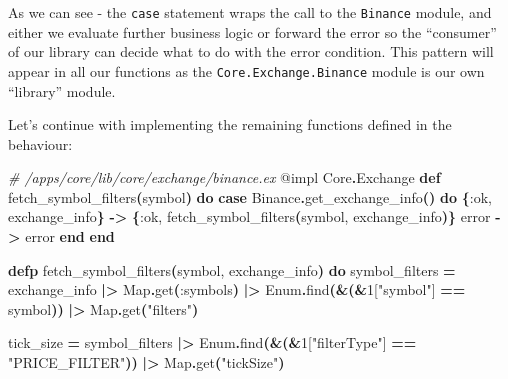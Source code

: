 \documentclass[
  oneside]{book}
\newenvironment{Shaded}{\begin{snugshade}}{\end{snugshade}}
\newcommand{\CommentTok}[1]{\textcolor[rgb]{0.56,0.35,0.01}{\textit{#1}}}
\newcommand{\ConstantTok}[1]{\textcolor[rgb]{0.56,0.35,0.01}{#1}}
\newcommand{\DecValTok}[1]{\textcolor[rgb]{0.00,0.00,0.81}{#1}}
\newcommand{\FunctionTok}[1]{\textcolor[rgb]{0.13,0.29,0.53}{\textbf{#1}}}
\newcommand{\KeywordTok}[1]{\textcolor[rgb]{0.13,0.29,0.53}{\textbf{#1}}}
\newcommand{\NormalTok}[1]{#1}
\newcommand{\OperatorTok}[1]{\textcolor[rgb]{0.81,0.36,0.00}{\textbf{#1}}}
\newcommand{\OtherTok}[1]{\textcolor[rgb]{0.56,0.35,0.01}{#1}}
\newcommand{\StringTok}[1]{\textcolor[rgb]{0.31,0.60,0.02}{#1}}
\newcommand{\VariableTok}[1]{\textcolor[rgb]{0.00,0.00,0.00}{#1}}
\begin{document}
As we can see - the \texttt{case} statement wraps the call to the \texttt{Binance} module, and either we evaluate further business logic or forward the error so the ``consumer'' of our library can decide what to do with the error condition. This pattern will appear in all our functions as the \texttt{Core.Exchange.Binance} module is our own ``library'' module.

Let's continue with implementing the remaining functions defined in the behaviour:

\begin{Shaded}
\begin{Highlighting}[]
  \CommentTok{\# /apps/core/lib/core/exchange/binance.ex}
  \OtherTok{@impl} \ConstantTok{Core}\OperatorTok{.}\ConstantTok{Exchange}
  \KeywordTok{def}\NormalTok{ fetch\_symbol\_filters}\FunctionTok{(}\NormalTok{symbol}\FunctionTok{)} \KeywordTok{do}
    \KeywordTok{case} \ConstantTok{Binance}\OperatorTok{.}\NormalTok{get\_exchange\_info}\FunctionTok{()} \KeywordTok{do}
      \FunctionTok{\{}\VariableTok{:ok}\NormalTok{, exchange\_info}\FunctionTok{\}} \OperatorTok{{-}\textgreater{}} \FunctionTok{\{}\VariableTok{:ok}\NormalTok{, fetch\_symbol\_filters}\FunctionTok{(}\NormalTok{symbol, exchange\_info}\FunctionTok{)\}}
\NormalTok{      error }\OperatorTok{{-}\textgreater{}}\NormalTok{ error}
    \KeywordTok{end}
  \KeywordTok{end}

  \KeywordTok{defp}\NormalTok{ fetch\_symbol\_filters}\FunctionTok{(}\NormalTok{symbol, exchange\_info}\FunctionTok{)} \KeywordTok{do}
\NormalTok{    symbol\_filters }\OperatorTok{=}
\NormalTok{      exchange\_info}
      \OperatorTok{|\textgreater{}} \ConstantTok{Map}\OperatorTok{.}\NormalTok{get}\FunctionTok{(}\VariableTok{:symbols}\FunctionTok{)}
      \OperatorTok{|\textgreater{}} \ConstantTok{Enum}\OperatorTok{.}\NormalTok{find}\FunctionTok{(}\OperatorTok{\&}\FunctionTok{(}\OperatorTok{\&}\DecValTok{1}\OtherTok{[}\StringTok{"symbol"}\OtherTok{]} \OperatorTok{==}\NormalTok{ symbol}\FunctionTok{))}
      \OperatorTok{|\textgreater{}} \ConstantTok{Map}\OperatorTok{.}\NormalTok{get}\FunctionTok{(}\StringTok{"filters"}\FunctionTok{)}

\NormalTok{    tick\_size }\OperatorTok{=}
\NormalTok{      symbol\_filters}
      \OperatorTok{|\textgreater{}} \ConstantTok{Enum}\OperatorTok{.}\NormalTok{find}\FunctionTok{(}\OperatorTok{\&}\FunctionTok{(}\OperatorTok{\&}\DecValTok{1}\OtherTok{[}\StringTok{"filterType"}\OtherTok{]} \OperatorTok{==} \StringTok{"PRICE\_FILTER"}\FunctionTok{))}
      \OperatorTok{|\textgreater{}} \ConstantTok{Map}\OperatorTok{.}\NormalTok{get}\FunctionTok{(}\StringTok{"tickSize"}\FunctionTok{)}


\end{Highlighting}
\end{Shaded}
\end{document}
